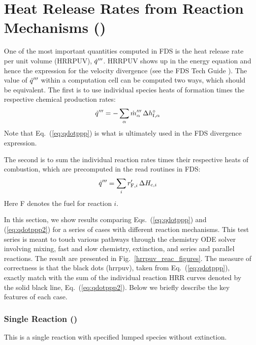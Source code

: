 \documentclass[11pt]{book}
\begin{document}
\section{Heat Release Rates from Reaction Mechanisms ()}
\label{hrrpuv_reac}
\label{hrrpuv_reac_arrhenius}
\label{hrrpuv_reac_extinction}
\label{hrrpuv_reac_parallel}
\label{hrrpuv_reac_parallel_2}
\label{hrrpuv_reac_series}
\label{hrrpuv_reac_simple}
\label{hrrpuv_reac_single}
\label{hrrpuv_reac_soot}

One of the most important quantities computed in FDS is the heat release rate per unit volume (HRRPUV), $\dot{q}^{{\prime\prime\prime}}$.  HRRPUV shows up in the energy equation and hence the expression for the velocity divergence (see the FDS Tech Guide \cite{FDS_Math_Guide}).  The value of $\dot{q}^{{\prime\prime\prime}}$ within a computation cell can be computed two ways, which should be equivalent.  The first is to use individual species heats of formation times the respective chemical production rates:
\begin{equation}
\label{eq:qdotppp}
\dot{q}^{{\prime\prime\prime}} = - \sum_\alpha \dot{m}_\alpha^{{\prime\prime\prime}} \, \Delta h_{{\rm f},\alpha}^\circ
\end{equation}
Note that Eq.~(\ref{eq:qdotppp}) is what is ultimately used in the FDS divergence expression.

The second is to sum the individual reaction rates  times their respective heats of combustion, which are precomputed in the read routines in FDS:
\begin{equation}
\label{eq:qdotppp2}
\dot{q}^{{\prime\prime\prime}} = \sum_i r_{{\rm F},i}^\prime \, \Delta H_{{\rm c},i}
\end{equation}
Here F denotes the fuel for reaction $i$.

In this section, we show results comparing Eqs.~(\ref{eq:qdotppp}) and (\ref{eq:qdotppp2}) for a series of cases with different reaction mechanisms.  This test series is meant to touch various pathways through the chemistry ODE solver involving mixing, fast and slow chemistry, extinction, and series and parallel reactions.  The result are presented in Fig.~\ref{hrrpuv_reac_figures}.  The measure of correctness is that the black dots (hrrpuv), taken from Eq.~(\ref{eq:qdotppp}), exactly match with the sum of the individual reaction HRR curves denoted by the solid black line, Eq.~(\ref{eq:qdotppp2}). Below we briefly describe the key features of each case.

\subsubsection{Single Reaction ()} This is a single reaction with specified lumped species without extinction.
\end{document}
